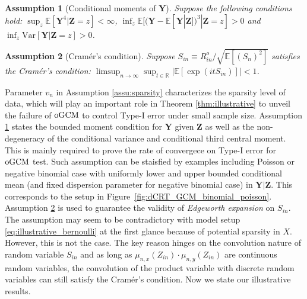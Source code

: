 \documentclass[12pt]{article}
\newtheorem{assumption}{Assumption}
\theoremstyle{definition}
\newcommand{\E}{\mathbb E}								%
\newcommand{\prz}{\bm Z}								%
\newcommand{\srz}{Z}									%
\newcommand{\pry}{{\bm Y}}								%
\newcommand{\oGCM}{\textnormal{oGCM}}						%
\begin{document}
\begin{assumption}[Conditional moments of $\pry$]\label{assu:finite-y-on-z-variance}
	Suppose the following conditions hold: $\sup_z\E[\pry^4|\prz=z]<\infty$, $\inf_z\E[(\pry - \E[\pry|\prz])^3|\prz=z]>0$ and $\inf_z\mathrm{Var}[\pry|\prz=z]>0$.
\end{assumption}
\begin{assumption}[Cram\'er's condition]\label{assu:abs-cont}
	Suppose $S_{in}\equiv R_{in}^o/\sqrt{\E[(S_n)^2]}$ satisfies the Cram\'er's condition: $\limsup_{n\rightarrow\infty}\sup_{t\in\mathbb{R}}|\E[\exp(itS_{in})]|<1$.
  \end{assumption}
Parameter $v_n$ in Assumption \ref{assu:sparsity} characterizes the sparsity level of data, which will play an important role in Theorem \ref{thm:illustrative} to unveil the failure of $\oGCM$ to control Type-I error under small sample size.  Assumption \ref{assu:finite-y-on-z-variance} states the bounded moment condition for $\pry$ given $\prz$ as well as the non-degeneracy of the conditional variance and conditional third central moment. This is mainly required to prove the rate of convergece on Type-I error for $\oGCM$ test. Such assumption can be staisfied by examples including Poisson or negative binomial case with uniformly lower and upper bounded conditional mean (and fixed dispersion parameter for negative binomial case) in $\pry|\prz$. This corresponds to the setup in Figure~\ref{fig:dCRT_GCM_binomial_poisson}. Assumption \ref{assu:abs-cont} is used to guarantee the validity of \textit{Edgeworth expansion} on $S_{in}$. The assumption may seem to be contradictory with model setup \eqref{eq:illustrative_bernoulli} at the first glance because of potential sparsity in $X$. However, this is not the case. The key reason hinges on the convolution nature of random variable $S_{in}$ and as long as $\mu_{n,x}(\srz_{in})\cdot \mu_{n,y}(\srz_{in})$ are continuous random variables, the convolution of the product variable with discrete random variables can still satisfy the Cram\'er's condition. Now we state our illustrative results.
\end{document}

